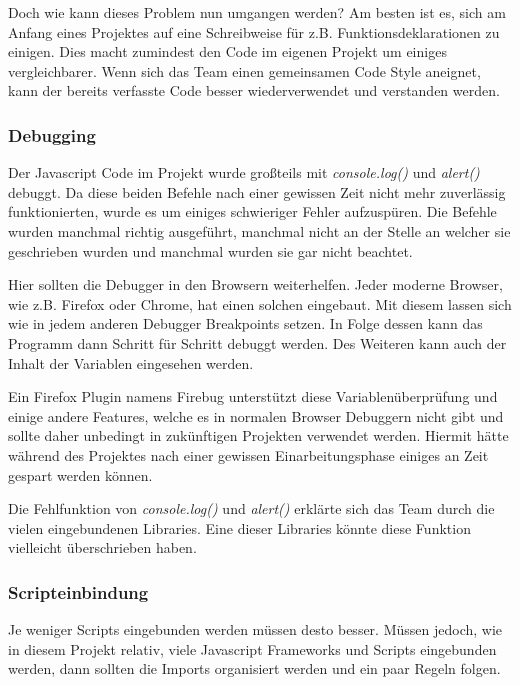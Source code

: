 Doch wie kann dieses Problem nun umgangen werden? Am besten ist es, sich am Anfang eines Projektes auf eine Schreibweise für z.B. Funktionsdeklarationen zu einigen. Dies macht zumindest den Code im eigenen Projekt um einiges vergleichbarer. Wenn sich das Team einen gemeinsamen Code Style aneignet, kann der bereits verfasste Code besser wiederverwendet und verstanden werden.

\newpage

\subsubsection{Debugging}
Der Javascript Code im Projekt wurde großteils mit \textit{console.log()} und \textit{alert()} debuggt. Da diese beiden Befehle nach einer gewissen Zeit nicht mehr zuverlässig funktionierten, wurde es um einiges schwieriger Fehler aufzuspüren. Die Befehle wurden manchmal richtig ausgeführt, manchmal nicht an der Stelle an welcher sie geschrieben wurden und manchmal wurden sie gar nicht beachtet. 

Hier sollten die Debugger in den Browsern weiterhelfen. Jeder moderne Browser, wie z.B. Firefox oder Chrome, hat einen solchen eingebaut. Mit diesem lassen sich wie in jedem anderen Debugger Breakpoints setzen. In Folge dessen kann das Programm dann Schritt für Schritt debuggt werden. Des Weiteren kann auch der Inhalt der Variablen eingesehen werden. 

Ein Firefox Plugin namens Firebug unterstützt diese Variablenüberprüfung und einige andere Features, welche es in normalen Browser Debuggern nicht gibt und sollte daher unbedingt in zukünftigen Projekten verwendet werden. Hiermit hätte während des Projektes nach einer gewissen Einarbeitungsphase einiges an Zeit gespart werden können. 


Die Fehlfunktion von \textit{console.log()} und \textit{alert()} erklärte sich das Team durch die vielen eingebundenen Libraries. Eine dieser Libraries könnte diese Funktion vielleicht überschrieben haben.

\newpage

\subsubsection{Scripteinbindung}
Je weniger Scripts eingebunden werden müssen desto besser. Müssen jedoch, wie in diesem Projekt relativ, viele Javascript Frameworks und Scripts eingebunden werden, dann sollten die Imports organisiert werden und ein paar Regeln folgen.

